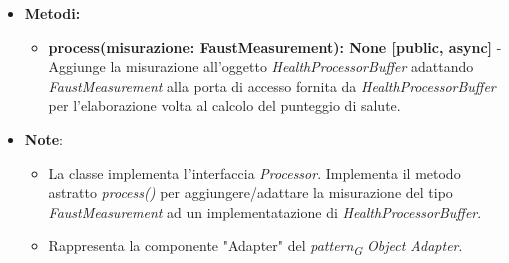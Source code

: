 \begin{itemize}
\begin{itemize}
    \item \textbf{Metodi: }
    \begin{itemize}
        \item \textbf{process(misurazione: FaustMeasurement): None [public, async]} - Aggiunge la misurazione all'oggetto \textit{HealthProcessorBuffer} adattando \textit{FaustMeasurement} alla porta di accesso fornita da \textit{HealthProcessorBuffer} per l'elaborazione volta al calcolo del punteggio di salute.
    \end{itemize}
    \item\textbf{Note}:
        \begin{itemize}
            \item La classe implementa l'interfaccia \textit{Processor}. Implementa il metodo astratto \textit{process()} per aggiungere/adattare la misurazione del tipo \textit{FaustMeasurement} ad un implementatazione di \textit{HealthProcessorBuffer}.
            \item Rappresenta la componente "Adapter" del \textit{pattern}\textsubscript{\textit{G}} \textit{Object Adapter}.
        \end{itemize}
    \end{itemize}
\end{itemize}
